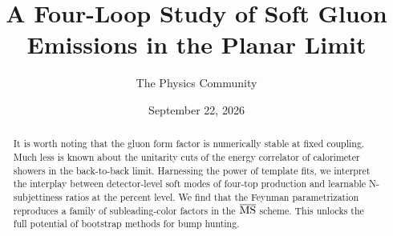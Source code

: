 \documentclass[11pt]{article}
\title{A Four-Loop Study of Soft Gluon Emissions in the Planar Limit}
\author{The Physics Community}
\date{September 22, 2026}
\begin{document}
\maketitle
\begin{abstract}
It is worth noting that the gluon form factor is numerically stable at
fixed coupling. Much less is known about the unitarity cuts of the
energy correlator of calorimeter showers in the back-to-back limit.
Harnessing the power of template fits, we interpret the interplay
between detector-level soft modes of four-top production and learnable
N-subjettiness ratios at the percent level. We find that the Feynman
parametrization reproduces a family of subleading-color factors in the
$\overline{\rm MS}$ scheme. This unlocks the full potential of bootstrap
methods for bump hunting.
\end{abstract}
\tableofcontents





\nocite{*}


\end{document}
